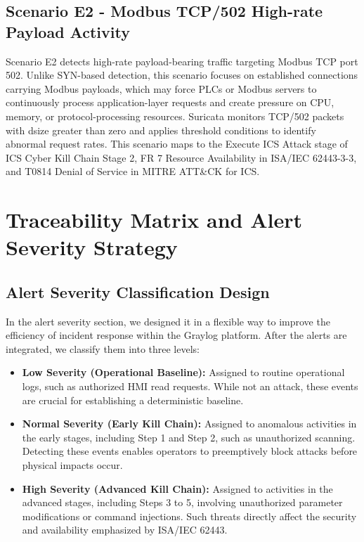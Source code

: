 \subsection{Scenario E2 - Modbus TCP/502 High-rate Payload Activity}Scenario E2 detects high-rate payload-bearing traffic targeting Modbus TCP port 502. Unlike SYN-based detection, this scenario focuses on established connections carrying Modbus payloads, which may force PLCs or Modbus servers to continuously process application-layer requests and create pressure on CPU, memory, or protocol-processing resources. Suricata monitors TCP/502 packets with dsize greater than zero and applies threshold conditions to identify abnormal request rates. This scenario maps to the Execute ICS Attack stage of ICS Cyber Kill Chain Stage 2, FR 7 Resource Availability in ISA/IEC 62443-3-3, and T0814 Denial of Service in MITRE ATT\&CK for ICS.
\newpage

\section{Traceability Matrix and Alert Severity Strategy}
\noindent

\subsection{Alert Severity Classification Design}
In the alert severity section, we designed it in a flexible way to improve the efficiency of incident response within the Graylog platform. After the alerts are integrated, we classify them into three levels:

\begin{itemize}
    \item 
    \textbf{Low Severity (Operational Baseline):} 
    Assigned to routine operational logs, such as authorized HMI read requests. While not an attack, these events are crucial for establishing a deterministic baseline.
    \item
    \textbf{Normal Severity (Early Kill Chain):} Assigned to anomalous activities in the early stages, including Step 1 and Step 2, such as unauthorized scanning. Detecting these events enables operators to preemptively block attacks before physical impacts occur.
    \item
    \textbf{High Severity (Advanced Kill Chain):} Assigned to activities in the advanced stages, including Steps 3 to 5, involving unauthorized parameter modifications or command injections. Such threats directly affect the security and availability emphasized by ISA/IEC 62443.
\end{itemize}
\newpage
